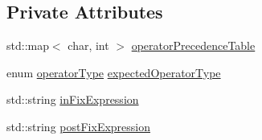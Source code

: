 \subsection*{Private Attributes}
\begin{DoxyCompactItemize}
\item 
std\-::map$<$ char, int $>$ \hyperlink{classexpression_parser_a7cff5468560616eadf8242d593d7f2fc}{operator\-Precedence\-Table}
\item 
enum \hyperlink{classexpression_parser_a32095df887afef8d80a03f4a44701b5b}{operator\-Type} \hyperlink{classexpression_parser_ab476557dbd05a4340329057317cb5175}{expected\-Operator\-Type}
\item 
std\-::string \hyperlink{classexpression_parser_a7b5cf82d367f3be9e9430cbbba7a3208}{in\-Fix\-Expression}
\item 
std\-::string \hyperlink{classexpression_parser_ae954010e5ba9d9ca5b8322f60d55dccc}{post\-Fix\-Expression}
\end{DoxyCompactItemize}


